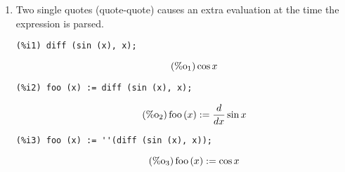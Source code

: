 \documentclass[12pt,leqno]{article}
\begin{document}
\begin{enumerate}
\item Two single quotes (quote-quote) causes an extra evaluation at the time the expression is parsed.
\begin{verbatim}
(%i1) diff (sin (x), x);
\end{verbatim}
\begin{equation}
\tag{$\mathop{\mathrm{\%o}}_{1}$}\cos x
\label{eq:doc-group1-code17-1-1}
\end{equation}
\begin{verbatim}
(%i2) foo (x) := diff (sin (x), x);
\end{verbatim}
\begin{equation}
\tag{$\mathop{\mathrm{\%o}}_{2}$}\mathop{\mathrm{foo}}\left(x\right) := \frac{d}{d x}\sin x
\label{eq:doc-group1-code17-2-1}
\end{equation}
\begin{verbatim}
(%i3) foo (x) := ''(diff (sin (x), x));
\end{verbatim}
\begin{equation}
\tag{$\mathop{\mathrm{\%o}}_{3}$}\mathop{\mathrm{foo}}\left(x\right) := \cos x
\label{eq:doc-group1-code17-3-1}
\end{equation}



\end{enumerate}
\end{document}
